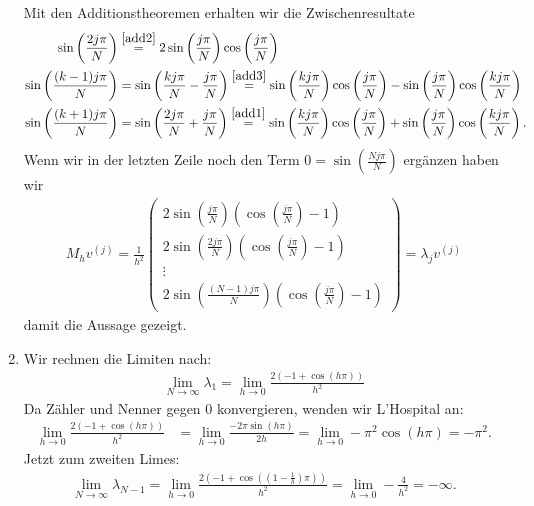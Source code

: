 \begin{solution}
\begin{enumerate}[label = \textbf{\alph*)}]
Mit den Additionstheoremen erhalten wir die Zwischenresultate
\begin{align*}
  \sin\left(\frac{2j\pi}{N}\right) &\stackrel{\eqref{add2}}{=}
  2\sin\left(\frac{j\pi}{N}\right)\cos\left(\frac{j\pi}{N}\right) \\
  \sin\left(\frac{(k-1)j\pi}{N}\right) &= \sin\left(\frac{kj\pi}{N}- \frac{j\pi}{N}\right)\stackrel{\eqref{add3}}{=}
  \sin\left(\frac{kj\pi}{N}\right)\cos\left(\frac{j\pi}{N}\right)
  - \sin\left(\frac{j\pi}{N}\right)\cos\left(\frac{kj\pi}{N}\right) \\
  \sin\left(\frac{(k+1)j\pi}{N}\right) &= \sin\left(\frac{2j\pi}{N}+ \frac{j\pi}{N}\right)
  \stackrel{\eqref{add1}}{=}
  \sin\left(\frac{kj\pi}{N}\right)\cos\left(\frac{j\pi}{N}\right)
  + \sin\left(\frac{j\pi}{N}\right)\cos\left(\frac{kj\pi}{N}\right).
\end{align*}
Wenn wir in der letzten Zeile noch den Term
$0 = \sin\left(\frac{Nj\pi}{N}\right)$ ergänzen haben wir
\begin{align*}
  M_h v^{(j)} = \frac{1}{h^2}\begin{pmatrix}
    2\sin\left(\frac{j\pi}{N}\right)\left(\cos\left(\frac{j\pi}{N}\right) - 1\right) \\
    2\sin\left(\frac{2j\pi}{N}\right)\left(\cos\left(\frac{j\pi}{N}\right) - 1\right)\\
    \vdots \\
    2\sin\left(\frac{(N-1)j\pi}{N}\right)\left(\cos\left(\frac{j\pi}{N}\right) - 1\right)
  \end{pmatrix}
  = \lambda_j v^{(j)}
\end{align*}
damit die Aussage gezeigt.
\item Wir rechnen die Limiten nach:
\begin{align*}
  \lim_{N \rightarrow \infty} \lambda_1 =
  \lim_{h \rightarrow 0} \frac{2\left(-1 + \cos\left(h\pi\right)\right)}{h^2}
\end{align*}
Da Zähler und Nenner gegen $0$ konvergieren, wenden wir L'Hospital an:
\begin{align*}
  \lim_{h \rightarrow 0} \frac{2\left(-1 + \cos\left(h\pi\right)\right)}{h^2}
  &= \lim_{h \rightarrow 0} \frac{-2\pi\sin(h\pi)}{2h}
  = \lim_{h \rightarrow 0} -\pi^2\cos(h\pi) = -\pi^2.
\end{align*}
Jetzt zum zweiten Limes:
\begin{align*}
\lim_{N \rightarrow \infty} \lambda_{N-1} =
\lim_{h \rightarrow 0} \frac{2\left(-1 + \cos\left((1 - \frac{1}{h})\pi\right)\right)}{h^2}
= \lim_{h \rightarrow 0} -\frac{4}{h^2} = -\infty.
\end{align*}
\end{enumerate}
\end{solution}
